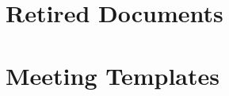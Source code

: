 \documentclass{article}
\begin{document}
\newpage


\newpage



\newpage
\section{Retired Documents}

\newpage


\newpage


\newpage


\newpage



\newpage
\section{Meeting Templates}

\newpage

\newpage

\end{document}
